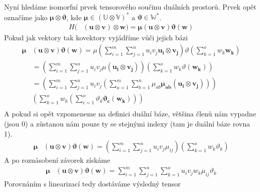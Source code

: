 \documentclass[a5paper,12pt]{amsbook}
\theoremstyle{definition}
\newcommand{\myvec}[1]{\bm{#1}}
\newcommand{\myspace}[1]{\mathbb{#1}}
\begin{document}
Nyní hledáme isomorfní prvek tensorového součinu duálních prostorů. Prvek opět označíme jako
$\myvec{\mu}\otimes\myvec{\vartheta}$, kde $\myvec{\mu}\in(\myspace{U}\otimes\myspace{V})^*$ a
$\myvec{\vartheta}\in\myspace{W}^*$.
\begin{equation*}
\begin{split}
H(&(\myvec{u}\otimes\myvec{v})\otimes\myvec{w}) 
  = \myvec{\mu}(\myvec{u}\otimes\myvec{v})\myvec{\vartheta}(\myvec{w})
\end{split}
\end{equation*}
Pokud jak vektory tak kovektory vyjádříme vůči jejich bázi
\begin{equation*}
\begin{split}
\myvec{\mu}&(\myvec{u}\otimes\myvec{v})\myvec{\vartheta}(\myvec{w}) = 
  \mu\left(\sum_{i=1}^{m}\sum_{j=1}^{n}u_i v_j \myvec{u_i}\otimes\myvec{v_j}\right)
  \vartheta\left(\sum_{k=1}^{o}w_k\myvec{w_k}\right) \\
&= \left(\sum_{i=1}^{m}\sum_{j=1}^{n}u_i v_j \mu(\myvec{u_i}\otimes\myvec{v_j})\right)
  \left(\sum_{k=1}^{o}w_k\vartheta(\myvec{w_k})\right) \\
&= \left(\sum_{i=1}^{m}\sum_{j=1}^{n}u_i v_j
     \left(\sum_{a=1}^{m}\sum_{b=1}^{n}\mu_{ab}\myvec{\mu_{ab}}(\myvec{u_i}\otimes\myvec{v_j})\right)\right) \\
  &\left(\sum_{k=1}^{o}w_k \left(\sum_{c=1}^{o}\vartheta_k\myvec{\vartheta_c}(\myvec{w_k})\right)\right) \\
\end{split}
\end{equation*}
A pokud si opět vzpomeneme na definici duální báze, většina členů nám vypadne (jsou 0) a zůstanou nám pouze
ty se stejnými indexy (tam je duální báze rovna 1).
\begin{equation*}
\begin{split}
\myvec{\mu}&(\myvec{u}\otimes\myvec{v})\myvec{\vartheta}(\myvec{w}) = 
  \left(\sum_{i=1}^{m}\sum_{j=1}^{n}u_i v_j \mu_{ij}\right)
  \left(\sum_{k=1}^{o}w_k \vartheta_k\right)
\end{split}
\end{equation*}
A po roznásobení závorek získáme
\begin{equation*}
\begin{split}
\myvec{\mu}&(\myvec{u}\otimes\myvec{v})\myvec{\vartheta}(\myvec{w}) = 
  \sum_{i=1}^{m}\sum_{j=1}^{n}\sum_{k=1}^{o}u_i v_j w_k \mu_{ij}\vartheta_k
\end{split}
\end{equation*}
Porovnáním s linearizací tedy dostáváme výsledný tensor
\end{document}

